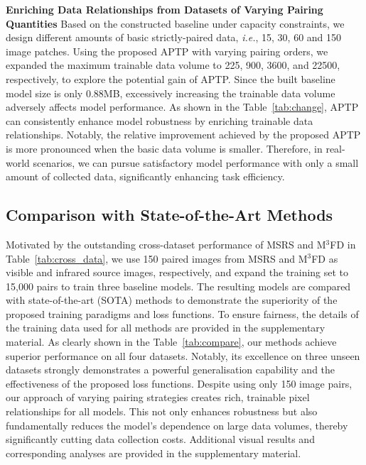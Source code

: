 \noindent\textbf{Enriching Data Relationships from Datasets of Varying Pairing Quantities}
Based on the constructed baseline under capacity constraints, we design different amounts of basic strictly-paired data, \textit{i.e.}, 15, 30, 60 and 150 image patches.
Using the proposed APTP with varying pairing orders, we expanded the maximum trainable data volume to 225, 900, 3600, and 22500, respectively, to explore the potential gain of APTP. 
Since the built baseline model size is only 0.88MB, excessively increasing the trainable data volume adversely affects model performance.
As shown in the Table~\ref{tab:change}, APTP can consistently enhance model robustness by enriching trainable data relationships. 
Notably, the relative improvement achieved by the proposed APTP is more pronounced when the basic data volume is smaller.
Therefore, in real-world scenarios, we can pursue satisfactory model performance with only a small amount of collected data, significantly enhancing task efficiency.



\subsection{Comparison with State-of-the-Art Methods}
Motivated by the outstanding cross-dataset performance of MSRS and M$^3$FD in Table~\ref{tab:cross_data}, we use 150 paired images from MSRS and M$^3$FD as visible and infrared source images, respectively, and expand the training set to 15,000 pairs to train three baseline models. 
The resulting models are compared with state-of-the-art (SOTA) methods to demonstrate the superiority of the proposed training paradigms and loss functions. 
To ensure fairness, the details of the training data used for all methods are provided in the supplementary material. 
As clearly shown in the Table~\ref{tab:compare}, our methods achieve superior performance on all four datasets. 
Notably, its excellence on three unseen datasets strongly demonstrates a powerful generalisation capability and the effectiveness of the proposed loss functions. 
Despite using only 150 image pairs, our approach of varying pairing strategies creates rich, trainable pixel relationships for all models. 
This not only enhances robustness but also fundamentally reduces the model's dependence on large data volumes, thereby significantly cutting data collection costs. 
Additional visual results and corresponding analyses are provided in the supplementary material. 

